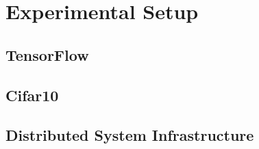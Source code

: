 \section{Experimental Setup}
\subsection{TensorFlow}
\subsection{Cifar10}
\subsection{Distributed System Infrastructure}
